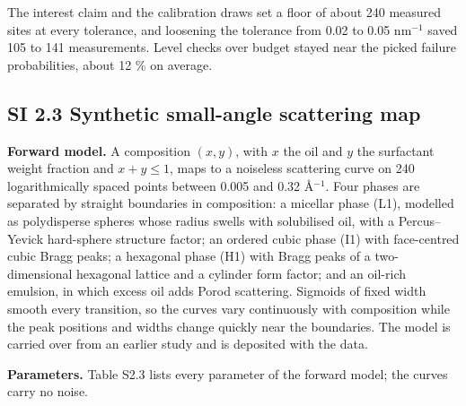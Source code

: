 \documentclass{iopjournal}
\begin{document}
The interest claim and the calibration draws set a floor of about 240 measured sites at every tolerance, and loosening the tolerance from 0.02 to 0.05 nm\ensuremath{^{-1}} saved 105 to 141 measurements. Level checks over budget stayed near the picked failure probabilities, about 12 \% on average.

\hypertarget{si-2.3-synthetic-small-angle-scattering-map}{%
\subsection*{SI 2.3 Synthetic small-angle scattering map}\label{si-2.3-synthetic-small-angle-scattering-map}}

\textbf{Forward model.} A composition \((x, y)\), with \(x\) the oil and \(y\) the surfactant weight fraction and \(x + y \le 1\), maps to a noiseless scattering curve on 240 logarithmically spaced points between 0.005 and 0.32 \AA{}\ensuremath{^{-1}}. Four phases are separated by straight boundaries in composition: a micellar phase (L1), modelled as polydisperse spheres whose radius swells with solubilised oil, with a Percus--Yevick hard-sphere structure factor; an ordered cubic phase (I1) with face-centred cubic Bragg peaks; a hexagonal phase (H1) with Bragg peaks of a two-dimensional hexagonal lattice and a cylinder form factor; and an oil-rich emulsion, in which excess oil adds Porod scattering. Sigmoids of fixed width smooth every transition, so the curves vary continuously with composition while the peak positions and widths change quickly near the boundaries. The model is carried over from an earlier study and is deposited with the data.

\textbf{Parameters.} Table S2.3 lists every parameter of the forward model; the curves carry no noise.
\end{document}
